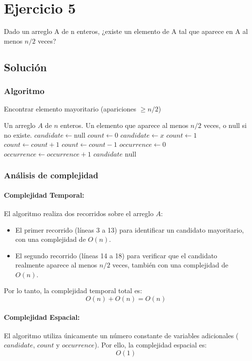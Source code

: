 \section{Ejercicio 5}
Dado un arreglo A de n enteros, ¿existe un elemento de A tal que aparece en A al menos $n/2$ veces?

\subsection*{Solución}
\subsubsection*{Algoritmo}
\begin{algorithm}[H]
\caption{Encontrar elemento mayoritario (apariciones $\geq n/2$)}
\begin{algorithmic}[1]
\REQUIRE Un arreglo \( A \) de \( n \) enteros.
\ENSURE Un elemento que aparece al menos \( n/2 \) veces, o \(\text{null}\) si no existe.
\STATE \( candidate \gets \text{null} \)
\STATE \( count \gets 0 \)
        \STATE \( candidate \gets x \)
        \STATE \( count \gets 1 \)
    \ELSE
            \STATE \( count \gets count + 1 \)
        \ELSE
            \STATE \( count \gets count - 1 \)
        \ENDIF
    \ENDIF
\ENDFOR
\STATE \( occurrence \gets 0 \)
         \STATE \( occurrence \gets occurrence + 1 \)
    \ENDIF
\ENDFOR
{}
    \RETURN \( candidate \)
\ELSE
    \RETURN \(\text{null}\) 
\ENDIF
\end{algorithmic}
\end{algorithm}

\subsubsection*{Análisis de complejidad}
\paragraph{Complejidad Temporal:}
El algoritmo realiza dos recorridos sobre el arreglo \( A \):
\begin{itemize}
    \item El primer recorrido (líneas 3 a 13) para identificar un candidato mayoritario, con una complejidad de \( O(n) \).
    \item El segundo recorrido (líneas 14 a 18) para verificar que el candidato realmente aparece al menos \( n/2 \) veces, también con una complejidad de \( O(n) \).
\end{itemize}
Por lo tanto, la complejidad temporal total es:
\[
O(n) + O(n) = O(n)
\]

\paragraph{Complejidad Espacial:}
El algoritmo utiliza únicamente un número constante de variables adicionales (\( candidate \), \( count \) y \( occurrence \)). Por ello, la complejidad espacial es:
\[
O(1)
\]